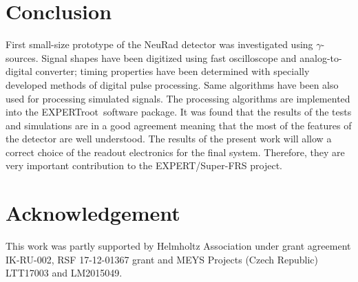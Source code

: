 \documentclass{webofc}
\newcommand{\er}{\textmd{EXPERTroot}}
\begin{document}
\section{Conclusion}
	
	First small-size prototype of the NeuRad detector was investigated using $\gamma$-sources. Signal shapes have been digitized using fast oscilloscope and analog-to-digital converter; timing properties have been determined with specially developed methods of digital pulse processing. Same algorithms have been also used for processing simulated signals. The processing algorithms are implemented into the \er\, software package. It was found that the results of the tests and simulations are in a good agreement meaning that the most of the features of the detector are well understood. The results of the present work will allow a correct choice of the readout electronics for the final system. Therefore, they are very important contribution to the EXPERT/Super-FRS project.
	
	
	
	
	
\section{Acknowledgement}
This  work was partly supported by Helmholtz Association under grant agreement IK-RU-002, RSF 17-12-01367 grant and MEYS Projects (Czech Republic) LTT17003 and LM2015049.
\end{document}
